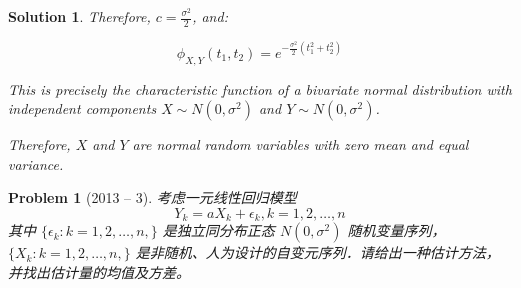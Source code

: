 \documentclass[12pt]{amsart}
\newtheorem{problem}{Problem}
\newtheorem*{solution}{Solution}
\begin{document}
\begin{solution}
Therefore, $c = \frac{\sigma^2}{2}$, and:

\begin{equation}
\phi_{X,Y}(t_1, t_2) = e^{-\frac{\sigma^2}{2}(t_1^2 + t_2^2)}
\end{equation}

This is precisely the characteristic function of a bivariate normal distribution with independent components $X \sim N(0, \sigma^2)$ and $Y \sim N(0, \sigma^2)$.

Therefore, $X$ and $Y$ are normal random variables with zero mean and equal variance.
\end{solution}
\begin{problem}[2013 -- 3]
考虑一元线性回归模型
$$
Y_k=a X_k+\epsilon_k, k=1,2, \ldots, n
$$
其中 $\{\epsilon_k: k=1,2, \ldots, n,\}$ 是独立同分布正态 $N(0, \sigma^2)$ 随机变量序列， $\{X_k: k=1,2, \ldots, n,\}$ 是非随机、人为设计的自变元序列．请给出一种估计方法，并找出估计量的均值及方差。
\end{problem}
\end{document}
